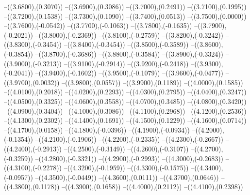 {	--({\sx*(3.6800)},{\sy*(0.3070)})
	--({\sx*(3.6900)},{\sy*(0.3086)})
	--({\sx*(3.7000)},{\sy*(0.2491)})
	--({\sx*(3.7100)},{\sy*(0.1995)})
	--({\sx*(3.7200)},{\sy*(0.1538)})
	--({\sx*(3.7300)},{\sy*(0.1090)})
	--({\sx*(3.7400)},{\sy*(0.0513)})
	--({\sx*(3.7500)},{\sy*(0.0000)})
	--({\sx*(3.7600)},{\sy*(-0.0542)})
	--({\sx*(3.7700)},{\sy*(-0.1063)})
	--({\sx*(3.7800)},{\sy*(-0.1635)})
	--({\sx*(3.7900)},{\sy*(-0.2021)})
	--({\sx*(3.8000)},{\sy*(-0.2369)})
	--({\sx*(3.8100)},{\sy*(-0.2759)})
	--({\sx*(3.8200)},{\sy*(-0.3242)})
	--({\sx*(3.8300)},{\sy*(-0.3454)})
	--({\sx*(3.8400)},{\sy*(-0.3454)})
	--({\sx*(3.8500)},{\sy*(-0.3589)})
	--({\sx*(3.8600)},{\sy*(-0.3854)})
	--({\sx*(3.8700)},{\sy*(-0.3686)})
	--({\sx*(3.8800)},{\sy*(-0.3584)})
	--({\sx*(3.8900)},{\sy*(-0.3324)})
	--({\sx*(3.9000)},{\sy*(-0.3213)})
	--({\sx*(3.9100)},{\sy*(-0.2914)})
	--({\sx*(3.9200)},{\sy*(-0.2418)})
	--({\sx*(3.9300)},{\sy*(-0.2041)})
	--({\sx*(3.9400)},{\sy*(-0.1602)})
	--({\sx*(3.9500)},{\sy*(-0.1079)})
	--({\sx*(3.9600)},{\sy*(-0.0477)})
	--({\sx*(3.9700)},{\sy*(0.0032)})
	--({\sx*(3.9800)},{\sy*(0.0557)})
	--({\sx*(3.9900)},{\sy*(0.1189)})
	--({\sx*(4.0000)},{\sy*(0.1585)})
	--({\sx*(4.0100)},{\sy*(0.2018)})
	--({\sx*(4.0200)},{\sy*(0.2293)})
	--({\sx*(4.0300)},{\sy*(0.2795)})
	--({\sx*(4.0400)},{\sy*(0.3247)})
	--({\sx*(4.0500)},{\sy*(0.3325)})
	--({\sx*(4.0600)},{\sy*(0.3558)})
	--({\sx*(4.0700)},{\sy*(0.3485)})
	--({\sx*(4.0800)},{\sy*(0.3420)})
	--({\sx*(4.0900)},{\sy*(0.3404)})
	--({\sx*(4.1000)},{\sy*(0.3086)})
	--({\sx*(4.1100)},{\sy*(0.2968)})
	--({\sx*(4.1200)},{\sy*(0.2536)})
	--({\sx*(4.1300)},{\sy*(0.2302)})
	--({\sx*(4.1400)},{\sy*(0.1691)})
	--({\sx*(4.1500)},{\sy*(0.1229)})
	--({\sx*(4.1600)},{\sy*(0.0714)})
	--({\sx*(4.1700)},{\sy*(0.0158)})
	--({\sx*(4.1800)},{\sy*(-0.0396)})
	--({\sx*(4.1900)},{\sy*(-0.0934)})
	--({\sx*(4.2000)},{\sy*(-0.1354)})
	--({\sx*(4.2100)},{\sy*(-0.1906)})
	--({\sx*(4.2200)},{\sy*(-0.2335)})
	--({\sx*(4.2300)},{\sy*(-0.2667)})
	--({\sx*(4.2400)},{\sy*(-0.2913)})
	--({\sx*(4.2500)},{\sy*(-0.3149)})
	--({\sx*(4.2600)},{\sy*(-0.3107)})
	--({\sx*(4.2700)},{\sy*(-0.3259)})
	--({\sx*(4.2800)},{\sy*(-0.3321)})
	--({\sx*(4.2900)},{\sy*(-0.2993)})
	--({\sx*(4.3000)},{\sy*(-0.2683)})
	--({\sx*(4.3100)},{\sy*(-0.2278)})
	--({\sx*(4.3200)},{\sy*(-0.1959)})
	--({\sx*(4.3300)},{\sy*(-0.1575)})
	--({\sx*(4.3400)},{\sy*(-0.0957)})
	--({\sx*(4.3500)},{\sy*(-0.0449)})
	--({\sx*(4.3600)},{\sy*(0.0111)})
	--({\sx*(4.3700)},{\sy*(0.0646)})
	--({\sx*(4.3800)},{\sy*(0.1178)})
	--({\sx*(4.3900)},{\sy*(0.1658)})
	--({\sx*(4.4000)},{\sy*(0.2112)})
	--({\sx*(4.4100)},{\sy*(0.2398)})
}
